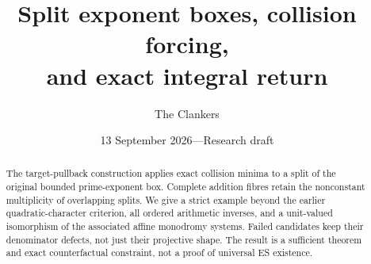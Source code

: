 \documentclass[11pt,a4paper]{article}
\title{Split exponent boxes, collision forcing,\\and exact integral return}
\author{The Clankers}
\date{13 September 2026\quad---\quad Research draft}
\begin{document}
\maketitle
\begin{abstract}
The target-pullback construction applies exact collision minima to a split
of the original bounded prime-exponent box. Complete addition fibres retain
the nonconstant multiplicity of overlapping splits. We give a strict example
beyond the earlier quadratic-character criterion, all ordered arithmetic
inverses, and a unit-valued isomorphism of the associated affine monodromy
systems. Failed candidates keep their denominator defects, not just their
projective shape. The result is a sufficient theorem and exact counterfactual
constraint, not a proof of universal ES existence.
\end{abstract}



\end{document}
